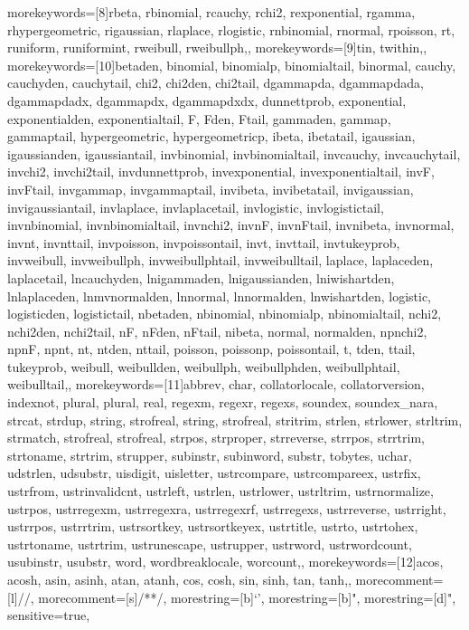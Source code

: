 {	%
	morekeywords=[8]{rbeta, rbinomial, rcauchy, rchi2, rexponential, rgamma, rhypergeometric, rigaussian, rlaplace, rlogistic, rnbinomial, rnormal, rpoisson, rt, runiform, runiformint, rweibull, rweibullph,},
	morekeywords=[9]{tin, twithin,},
	morekeywords=[10]{betaden, binomial, binomialp, binomialtail, binormal, cauchy, cauchyden, cauchytail, chi2, chi2den, chi2tail, dgammapda, dgammapdada, dgammapdadx, dgammapdx, dgammapdxdx, dunnettprob, exponential, exponentialden, exponentialtail, F, Fden, Ftail, gammaden, gammap, gammaptail, hypergeometric, hypergeometricp, ibeta, ibetatail, igaussian, igaussianden, igaussiantail, invbinomial, invbinomialtail, invcauchy, invcauchytail, invchi2, invchi2tail, invdunnettprob, invexponential, invexponentialtail, invF, invFtail, invgammap, invgammaptail, invibeta, invibetatail, invigaussian, invigaussiantail, invlaplace, invlaplacetail, invlogistic, invlogistictail, invnbinomial, invnbinomialtail, invnchi2, invnF, invnFtail, invnibeta, invnormal, invnt, invnttail, invpoisson, invpoissontail, invt, invttail, invtukeyprob, invweibull, invweibullph, invweibullphtail, invweibulltail, laplace, laplaceden, laplacetail, lncauchyden, lnigammaden, lnigaussianden, lniwishartden, lnlaplaceden, lnmvnormalden, lnnormal, lnnormalden, lnwishartden, logistic, logisticden, logistictail, nbetaden, nbinomial, nbinomialp, nbinomialtail, nchi2, nchi2den, nchi2tail, nF, nFden, nFtail, nibeta, normal, normalden, npnchi2, npnF, npnt, nt, ntden, nttail, poisson, poissonp, poissontail, t, tden, ttail, tukeyprob, weibull, weibullden, weibullph, weibullphden, weibullphtail, weibulltail,},
	morekeywords=[11]{abbrev, char, collatorlocale, collatorversion, indexnot, plural, plural, real, regexm, regexr, regexs, soundex, soundex_nara, strcat, strdup, string, strofreal, string, strofreal, stritrim, strlen, strlower, strltrim, strmatch, strofreal, strofreal, strpos, strproper, strreverse, strrpos, strrtrim, strtoname, strtrim, strupper, subinstr, subinword, substr, tobytes, uchar, udstrlen, udsubstr, uisdigit, uisletter, ustrcompare, ustrcompareex, ustrfix, ustrfrom, ustrinvalidcnt, ustrleft, ustrlen, ustrlower, ustrltrim, ustrnormalize, ustrpos, ustrregexm, ustrregexra, ustrregexrf, ustrregexs, ustrreverse, ustrright, ustrrpos, ustrrtrim, ustrsortkey, ustrsortkeyex, ustrtitle, ustrto, ustrtohex, ustrtoname, ustrtrim, ustrunescape, ustrupper, ustrword, ustrwordcount, usubinstr, usubstr, word, wordbreaklocale, worcount,},
	morekeywords=[12]{acos, acosh, asin, asinh, atan, atanh, cos, cosh, sin, sinh, tan, tanh,},
	morecomment=[l]{//},
	morecomment=[s]{/*}{*/},
	morestring=[b]{`}{'},
	morestring=[b]",
	morestring=[d]",
	sensitive=true,
}


